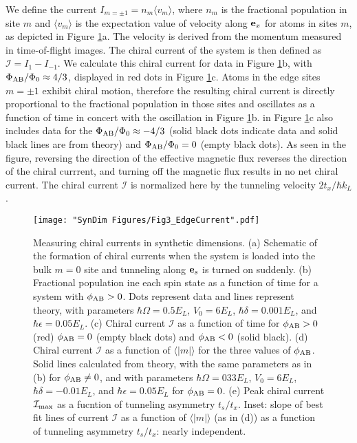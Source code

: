 We  define the current $I_{m=\pm1}=n_m \langle v_m \rangle$, where $n_m$ is the fractional population in site $m$ and $\langle v_m \rangle$ is the expectation value of velocity along ${\bf e}_x$ for atoms in sites $m$, as depicted in Figure \ref{fig:edgeCurrents}a. The velocity is derived from the momentum measured in time-of-flight images. The chiral current of the system is then defined as $\mathcal{I}=I_1-I_{-1}$. We calculate this chiral current for data in  Figure \ref{fig:edgeCurrents}b, with $\Phi_{\rm AB}/\Phi_0\approx4/3$, displayed in red dots in Figure \ref{fig:edgeCurrents}c. Atoms in the edge sites $m=\pm1$ exhibit chiral motion, therefore the resulting chiral current is directly proportional to the fractional population in those sites and oscillates as a function of time in concert with the oscillation in Figure \ref{fig:edgeCurrents}b. in Figure \ref{fig:edgeCurrents}c also includes data for the $\Phi_{\rm AB}/\Phi_0\approx-4/3$ (solid black dots indicate data and solid black lines are from theory) and $\Phi_{\rm AB}/\Phi_0=0$ (empty black dots). As seen in the figure, reversing the direction of the effective magnetic flux reverses the direction of the chiral currrent, and turning off the magnetic flux results in no net chiral current. The chiral current $\mathcal{I}$ is normalized here by the tunneling velocity $2 t_x/\hbar k_L$. 

\begin{figure}
	\texttt{[image: "SynDim Figures/Fig3\_EdgeCurrent".pdf]}
\caption[Measuring chiral currents in synthetic dimensions]{Measuring chiral currents in synthetic dimensions. (a) Schematic of the formation of chiral currents when the system is loaded into the bulk $m=0$ site and tunneling along ${\bf e}_s$ is turned on suddenly. (b) Fractional population ine each spin state as a function of time for a system with $\phi_{\rm AB}>0$. Dots represent data and lines represent theory, with parameters $\hbar\Omega=0.5 E_L$, $V_0=6 E_L$, $\hbar\delta=0.001 E_L$, and $\hbar\epsilon=0.05 E_L$. (c) Chiral current $\mathcal{I}$ as a function of time for $\phi_{\rm AB}>0$ (red) $\phi_{\rm AB}=0$ (empty black dots) and $\phi_{\rm AB}<0$ (solid black). (d) Chiral current $\mathcal{I}$ as a function of $\langle|m|\rangle$ for the three values of $\phi_{\rm AB}$. Solid lines calculated from theory, with the same parameters as in (b) for $\phi_{\rm AB}\neq0$, and with parameters $\hbar\Omega=033 E_L$, $V_0=6 E_L$, $\hbar\delta=-0.01 E_L$, and $\hbar\epsilon=0.05 E_L$ for $\phi_{\rm AB}=0$.  (e) Peak chiral current $\mathcal{I}_{\rm max}$ as a fucntion of tunneling asymmetry $t_s/t_x$. Inset: slope of best fit lines of current $\mathcal{I}$ as a function of $\langle|m|\rangle$ (as in (d)) as a function of tunneling asymmetry $t_s/t_x$: nearly independent. }
\label{fig:edgeCurrents}
\end{figure}


